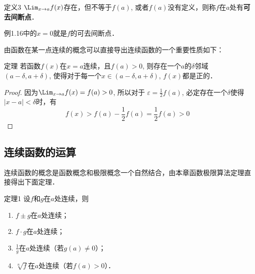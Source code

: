 \begin{blk}
    {定义3} $\Lim_{x\to a}f(x)$存在，但不等于$f(a)$, 或者$f(a)$没有定义，则称$f$在$a$处有\textbf{可去间断点}．
\end{blk}

例1.16中的$x=0$就是$f$的可去间断点．

由函数在某一点连续的概念可以直接导出连续函数的一个重要性质如下：

\begin{blk}
{定理} 若函数$f(x)$在$x=a$连续，且$f(a)>0$, 则存在一个$a$的$\delta$邻域$(a-\delta,a+\delta)$, 使得对于每一个$x\in (a-\delta,a+\delta)$, $f(x)$都是正的．    
\end{blk}

\begin{proof}
    因为$\Lim_{x\to a} f(x)=f(a)>0$, 所以对于
$\varepsilon=\frac{1}{2}f(a)$, 必定存在一个$\delta$使得$|x-a|<\delta$时，有
\[f (x) > f (a) -\frac{1}{2}f (a) =\frac{1}{2}f (a) > 0\]
\end{proof}

\subsection{连续函数的运算}
连续函数的概念是函数概念和极限概念一个自然结合，由本章函数极限算法定理直接得出下面定理．

\begin{blk}
 {定理1} 设$f$和$g$在$a$处连续，则
 \begin{enumerate}
     \item $f\pm g$在$a$处连续；
     \item $f\cdot g$在$a$处连续；
     \item $\frac{1}{g}$在$a$处连续（若$g(a)\ne 0$）；
     \item $\sqrt[n]{f}$在$a$处连续（若$f(a)>0$）．
 \end{enumerate}
\end{blk}

